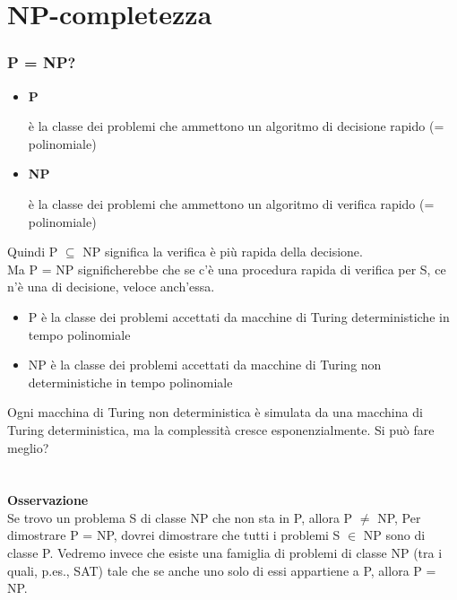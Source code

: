 \chapter{NP-completezza} \label{ch:capitolo12}
\subsection{P = NP?}
\begin{itemize}
    \item\textbf{P} 
    
è la classe dei problemi che ammettono un algoritmo di decisione rapido (= polinomiale)
    
    \item\textbf{NP} 
    
è la classe dei problemi che ammettono un algoritmo di verifica rapido (= polinomiale)
\end{itemize}
Quindi P $\subseteq$ NP significa la verifica è più rapida della decisione.\\
Ma P = NP significherebbe che se c’è una procedura rapida di verifica per S, ce n’è una di decisione, veloce anch’essa. 
\begin{itemize}
    \item P è la classe dei problemi accettati da macchine di Turing deterministiche in tempo polinomiale
    
    \item NP è la classe dei problemi accettati da macchine di Turing non deterministiche in tempo polinomiale
\end{itemize}
Ogni macchina di Turing non deterministica è simulata da una macchina di Turing deterministica, ma la complessità cresce esponenzialmente. Si può fare meglio?\\\\\\
\textbf{Osservazione}\\
Se trovo un problema S di classe NP che non sta in P, allora P $\neq$ NP, Per dimostrare P = NP, dovrei dimostrare che tutti i problemi S $\in$ NP sono di classe P.
Vedremo invece che esiste una famiglia di problemi di classe NP (tra i quali, p.es., SAT) tale che se anche uno solo di essi appartiene a P, allora P = NP.
